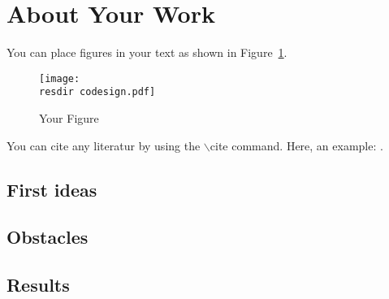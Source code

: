 \section{About Your Work}
You can place figures in your text as shown in Figure~\ref{yourfigure}.
\begin{figure}
\centering
\texttt{[image: \\resdir codesign.pdf]}
\caption{\label{yourfigure}Your Figure}
\end{figure}
\par
You can cite any literatur by using the $\backslash$cite command. 
Here, an example: \cite{btt:1998}.
\subsection{First ideas}
\subsection{Obstacles}
\subsection{Results}

\clearpage
\appendix




